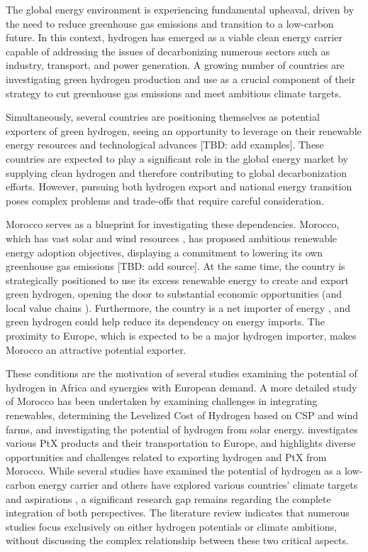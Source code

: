 The global energy environment is experiencing fundamental upheaval, driven by the need to reduce greenhouse gas emissions and transition to a low-carbon future. In this context, hydrogen has emerged as a viable clean energy carrier capable of addressing the issues of decarbonizing numerous sectors such as industry, transport, and power generation. A growing number of countries are investigating green hydrogen production and use as a crucial component of their strategy to cut greenhouse gas emissions and meet ambitious climate targets.


Simultaneously, several countries are positioning themselves as potential exporters of green hydrogen, seeing an opportunity to leverage on their renewable energy resources and technological advances [TBD: add examples]. These countries are expected to play a significant role in the global energy market by supplying clean hydrogen and therefore contributing to global decarbonization efforts. However, pursuing both hydrogen export and national energy transition poses complex problems and trade-offs that require careful consideration.

Morocco serves as a blueprint for investigating these dependencies. Morocco, which has vast solar and wind resources \cite{Peters2023, Touili2018, Sterl2022}, has proposed ambitious renewable energy adoption objectives, displaying a commitment to lowering its own greenhouse gas emissions [TBD: add source]. At the same time, the country is strategically positioned to use its excess renewable energy to create and export green hydrogen, opening the door to substantial economic opportunities (and local value chains \cite{Ersoy2022}). Furthermore, the country is a net importer of energy \cite{IEA2022}, and green hydrogen could help reduce its dependency on energy imports. The proximity to Europe, which is expected to be a major hydrogen importer, makes Morocco an attractive potential exporter. %

These conditions are the motivation of several studies \cite{Wijk2021, AbouSeada2022, Zwaan2021, Schellekens2010, Cavana2021, Touili2022, Timmerberg2019, Sens2022} examining the potential of hydrogen in Africa and synergies with European demand. A more detailed study of Morocco has been undertaken by \cite{Boulakhbar2020} examining challenges in integrating renewables, \cite{Khouya2020} determining the Levelized Cost of Hydrogen based on CSP and wind farms, and \cite{Touili2018} investigating the potential of hydrogen from solar energy. \cite{Hampp2021} investigates various PtX products and their transportation to Europe, and \cite{Eichhammer2019} highlights diverse opportunities and challenges related to exporting hydrogen and PtX from Morocco. While several studies have examined the potential of hydrogen as a low-carbon energy carrier \cite{Hampp2021, AbouSeada2022, Wijk2021} and others have explored various countries' climate targets and aspirations \cite{Boulakhbar2020}, a significant research gap remains regarding the complete integration of both perspectives. The literature review indicates that numerous studies focus exclusively on either hydrogen potentials or climate ambitions, without discussing the complex relationship between these two critical aspects.

